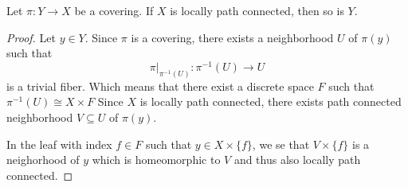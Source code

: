 \begin{rem}[]
  Let $\pi: Y \to X$ be a covering. If $X$ is locally path connected, then so is $Y$.
\end{rem}
\begin{proof}
  Let $y \in Y$. Since $\pi$ is a covering, there exists a neighborhood $U$ of $\pi(y)$ such that
  $$
  \pi|_{\pi^{-1}(U)}: \pi^{-1}(U) \to U
  $$
  is a trivial fiber. Which means that there exist a discrete space $F$ such that
  $
  \pi^{-1}(U) \cong X \times F
  $
  Since $X$ is locally path connected, there exists path connected neighborhood $V \subseteq U$ of $\pi(y)$.

  In the leaf with index $f \in F$ such that $y \in X \times \{f\}$, we se that $V \times \{f\}$ is a neighorhood of $y$ which is homeomorphic to $V$ and thus also locally path connected.
\end{proof}



